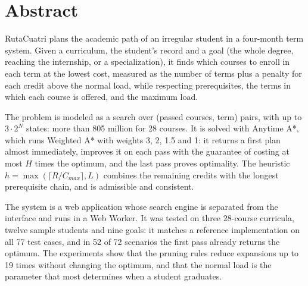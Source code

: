 \chapter*{Abstract}
RutaCuatri plans the academic path of an irregular student in a four-month term system. Given a curriculum, the student's record and a goal (the whole degree, reaching the internship, or a specialization), it finds which courses to enroll in each term at the lowest cost, measured as the number of terms plus a penalty for each credit above the normal load, while respecting prerequisites, the terms in which each course is offered, and the maximum load.

The problem is modeled as a search over (passed courses, term) pairs, with up to $3 \cdot 2^{N}$ states: more than 805 million for 28 courses. It is solved with Anytime A*, which runs Weighted A* with weights 3, 2, 1.5 and 1: it returns a first plan almost immediately, improves it on each pass with the guarantee of costing at most $H$ times the optimum, and the last pass proves optimality. The heuristic $h = \max(\lceil R/C_{max} \rceil, L)$ combines the remaining credits with the longest prerequisite chain, and is admissible and consistent.

The system is a web application whose search engine is separated from the interface and runs in a Web Worker. It was tested on three 28-course curricula, twelve sample students and nine goals: it matches a reference implementation on all 77 test cases, and in 52 of 72 scenarios the first pass already returns the optimum. The experiments show that the pruning rules reduce expansions up to 19 times without changing the optimum, and that the normal load is the parameter that most determines when a student graduates.
